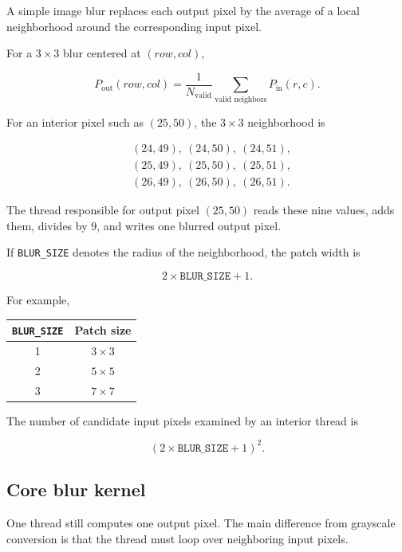 \documentclass[11pt,a4paper]{article}
\begin{document}
A simple image blur replaces each output pixel by the average of a local neighborhood around the corresponding input pixel.

For a \(3\times3\) blur centered at \((row,col)\),

\[
P_{\mathrm{out}}(row,col)
=
\frac{1}{N_{\mathrm{valid}}}
\sum_{\text{valid neighbors}}
P_{\mathrm{in}}(r,c).
\]

For an interior pixel such as \((25,50)\), the \(3\times3\) neighborhood is

\[
\begin{aligned}
&(24,49),\ (24,50),\ (24,51),\\
&(25,49),\ (25,50),\ (25,51),\\
&(26,49),\ (26,50),\ (26,51).
\end{aligned}
\]

The thread responsible for output pixel \((25,50)\) reads these nine values, adds them, divides by \(9\), and writes one blurred output pixel.

If \texttt{BLUR\_SIZE} denotes the radius of the neighborhood, the patch width is

\[
2\times\texttt{BLUR\_SIZE}+1.
\]

For example,

\begin{center}
\begin{tabular}{cc}
\toprule
\texttt{BLUR\_SIZE} & Patch size \\
\midrule
1 & \(3\times3\) \\
2 & \(5\times5\) \\
3 & \(7\times7\) \\
\bottomrule
\end{tabular}
\end{center}

The number of candidate input pixels examined by an interior thread is

\[
(2\times\texttt{BLUR\_SIZE}+1)^2.
\]

\subsection{Core blur kernel}

One thread still computes one output pixel. The main difference from grayscale conversion is that the thread must loop over neighboring input pixels.
\end{document}
